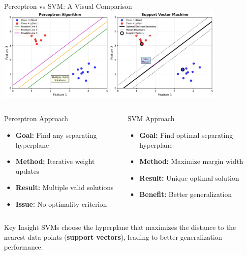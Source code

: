 \documentclass[8pt,aspectratio=1610]{beamer}
\begin{document}
\begin{frame}{Perceptron vs SVM: A Visual Comparison}
\centering
\includegraphics[width=0.85\textwidth]{../figures/perceptron_vs_svm.png}

\vspace{0.3cm}
\begin{columns}[t]
\begin{column}{0.48\textwidth}
\begin{block}{Perceptron Approach}
\begin{itemize}
\setlength{\itemsep}{1pt}
\item \textbf{Goal:} Find any separating hyperplane
\item \textbf{Method:} Iterative weight updates
\item \textbf{Result:} Multiple valid solutions
\item \textbf{Issue:} No optimality criterion
\end{itemize}
\end{block}
\end{column}

\begin{column}{0.48\textwidth}
\begin{block}{SVM Approach}
\begin{itemize}
\setlength{\itemsep}{1pt}
\item \textbf{Goal:} Find optimal separating hyperplane
\item \textbf{Method:} Maximize margin width
\item \textbf{Result:} Unique optimal solution
\item \textbf{Benefit:} Better generalization
\end{itemize}
\end{block}
\end{column}
\end{columns}

\begin{alertblock}{Key Insight}
SVMs choose the hyperplane that maximizes the distance to the nearest data points (\textbf{support vectors}), leading to better generalization performance.
\end{alertblock}
\end{frame}
\end{document}
